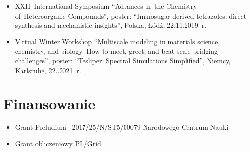 \begin{fullwidth}
\begin{itemize}
  \item XXII~International Symposium \enquote{Advances in~the Chemistry of~Heteroorganic Compounds}, poster: \enquote{Iminosugar derived tetrazoles: direct synthesis and mechanistic insights}, Polska, Łódź, 22.11.2019~r.
  \item Virtual Winter Workshop \enquote{Multiscale modeling in materials science, chemistry, and biology: How to meet, greet, and beat scale-bridging challenges}, poster: \enquote{Tesliper: Spectral Simulations Simplified}, Niemcy, Karlsruhe, 22..2021~r.
  
\end{itemize}
\end{fullwidth}

\section{Finansowanie}\label{intro:founding}
\begin{fullwidth}
\begin{itemize}
  \item Grant Preludium \textnumero~2017/25/N/ST5/00079 Narodowego Centrum Nauki
  \item Grant obliczeniowy PL\=/Grid
\end{itemize}
\end{fullwidth}

\begin{fullwidth}
  \printglossary[title=Wykaz skrótów, type=\acronymtype]
\end{fullwidth}
  